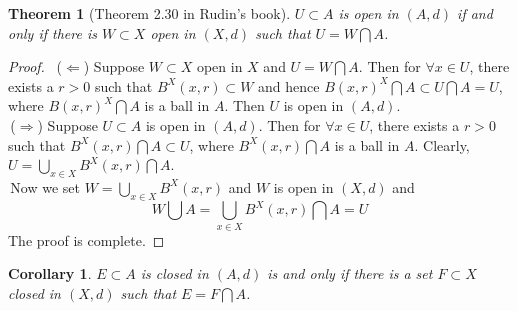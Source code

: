 \documentclass[12pt,leqno]{amsart}
\newtheorem{theorem}{Theorem}[section]
\newtheorem{corollary}{Corollary}[theorem]
\theoremstyle{definition}
\begin{document}
\begin{theorem}[Theorem 2.30 in Rudin's book]
$U\subset A$ is open in $(A,d)$ if and only if there is $W \subset X$ open in $(X,d)$ such that $U = W\bigcap A$.
\end{theorem}
\begin{proof}
$ $\newline
\hspace*{1em}\,($\Leftarrow$) Suppose $W\subset X$ open in $X$ and $U = W\bigcap A$. Then for $\forall x\in U$, there exists a $r>0$ such that $B^X(x,r)\subset W$ and hence $B(x,r)^X\bigcap A\subset U\bigcap A = U$, where $B(x,r)^X\bigcap A$ is a ball in $A$. Then $U$ is open in $(A,d)$.\\
\hspace*{1em}\,($\Rightarrow$) Suppose $U\subset A$ is open in $(A,d)$. Then for $\forall x\in U$, there exists a $r>0$ such that $B^X(x,r)\bigcap A\subset U$, where $B^X(x,r)\bigcap A$ is a ball in $A$. Clearly, $U = \bigcup_{x\in X}B^X(x,r)\bigcap A$.\\
\hspace*{1em}\,Now we set $W = \bigcup_{x\in X}B^X(x,r)$ and $W$ is open in $(X,d)$ and $$W\bigcup A = \bigcup_{x\in X}B^X(x,r)\bigcap A = U$$
The proof is complete.
\end{proof}

\begin{corollary}
$E\subset A$ is closed in $(A,d)$ is and only if there is a set $F\subset X$ closed in $(X,d)$ such that $E = F\bigcap A$.
\end{corollary}
\end{document}
